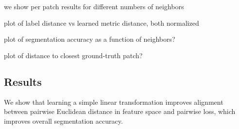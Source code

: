 we show per patch results for different numbers of neighbors 

plot of label distance vs learned metric distance, both normalized\

plot of segmentation accuracy as a function of neighbors?

plot of distance to closest ground-truth patch?













\subsection{Results}










We show that learning a simple linear transformation improves alignment between pairwise Euclidean distance in feature space and pairwise loss, which improves overall segmentation accuracy.





